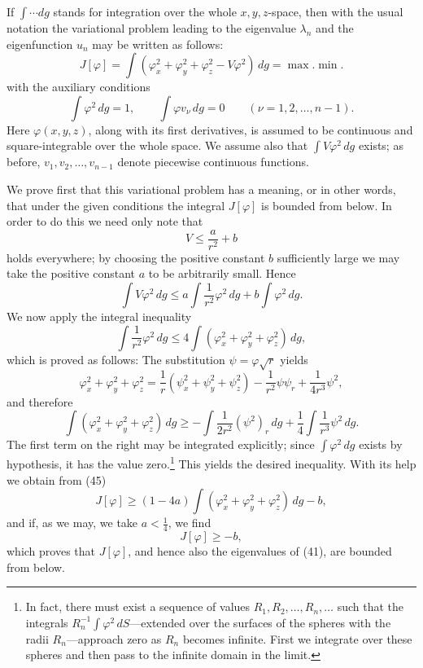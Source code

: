 If $\int\cdots dg$ stands for integration over the whole $x,y,z$-space, then with the usual notation the variational problem leading to the eigenvalue $\lambda_n$ and the eigenfunction $u_n$ may be written as follows:
\begin{equation}\tag{43}
J[\varphi]=\int(\varphi_x^2+\varphi_y^2+\varphi_z^2-V\varphi^2)\,dg=\max.\min.
\end{equation}
with the auxiliary conditions
\begin{equation}\tag{44}
\int\varphi^2\,dg=1,
\qquad
\int\varphi v_\nu\,dg=0\qquad(\nu=1,2,\ldots,n-1).
\end{equation}
Here $\varphi(x,y,z)$, along with its first derivatives, is assumed to be continuous and square-integrable over the whole space. We assume also that $\int V\varphi^2\,dg$ exists; as before, $v_1,v_2,\ldots,v_{n-1}$ denote piecewise continuous functions.

We prove first that this variational problem has a meaning, or in other words, that under the given conditions the integral $J[\varphi]$ is bounded from below. In order to do this we need only note that
\[
V\le\frac a{r^2}+b
\]
holds everywhere; by choosing the positive constant $b$ sufficiently large we may take the positive constant $a$ to be arbitrarily small. Hence
\begin{equation}\tag{45}
\int V\varphi^2\,dg\le a\int\frac1{r^2}\varphi^2\,dg+b\int\varphi^2\,dg.
\end{equation}
We now apply the integral inequality
\begin{equation}\tag{46}
\int\frac1{r^2}\varphi^2\,dg\le4\int(\varphi_x^2+\varphi_y^2+\varphi_z^2)\,dg,
\end{equation}
which is proved as follows: The substitution $\psi=\varphi\sqrt r$ yields
\[
\varphi_x^2+\varphi_y^2+\varphi_z^2
=\frac1r(\psi_x^2+\psi_y^2+\psi_z^2)-\frac1{r^2}\psi\psi_r+\frac1{4r^3}\psi^2,
\]
and therefore
\[
\int(\varphi_x^2+\varphi_y^2+\varphi_z^2)\,dg
\ge-\int\frac1{2r^2}(\psi^2)_r\,dg+\frac14\int\frac1{r^3}\psi^2\,dg.
\]
The first term on the right may be integrated explicitly; since $\int\varphi^2\,dg$ exists by hypothesis, it has the value zero.\footnote{In fact, there must exist a sequence of values $R_1,R_2,\ldots,R_n,\ldots$ such that the integrals $R_n^{-1}\int\varphi^2\,dS$---extended over the surfaces of the spheres with the radii $R_n$---approach zero as $R_n$ becomes infinite. First we integrate over these spheres and then pass to the infinite domain in the limit.} This yields the desired inequality. With its help we obtain from (45)
\[
J[\varphi]\ge(1-4a)\int(\varphi_x^2+\varphi_y^2+\varphi_z^2)\,dg-b,
\]
and if, as we may, we take $a<\tfrac14$, we find
\[
J[\varphi]\ge-b,
\]
which proves that $J[\varphi]$, and hence also the eigenvalues of (41), are bounded from below.

